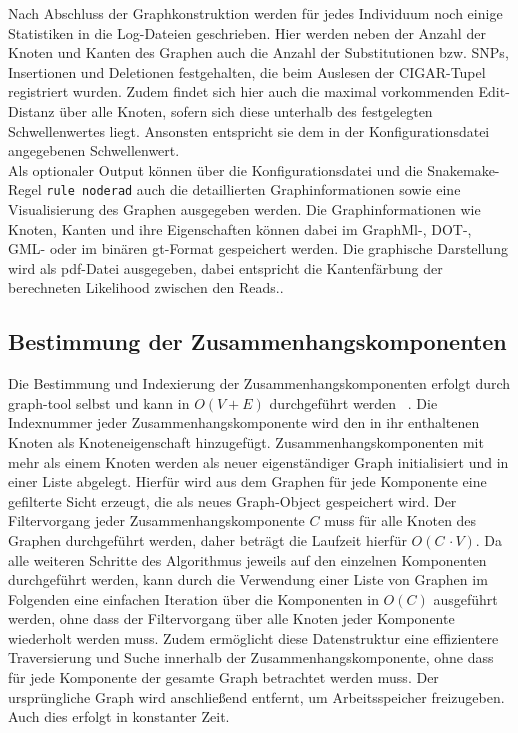 Nach Abschluss der Graphkonstruktion werden für jedes Individuum noch einige Statistiken in die Log-Dateien geschrieben. Hier werden neben der Anzahl der Knoten und Kanten des Graphen auch die Anzahl der Substitutionen bzw. SNPs, Insertionen und Deletionen festgehalten, die beim Auslesen der CIGAR-Tupel registriert wurden. Zudem findet sich hier auch die maximal vorkommenden Edit-Distanz über alle Knoten, sofern sich diese unterhalb des festgelegten Schwellenwertes liegt. Ansonsten entspricht sie dem in der Konfigurationsdatei angegebenen Schwellenwert.\\

Als optionaler Output können über die Konfigurationsdatei und die Snakemake-Regel \lstinline|rule noderad| auch die detaillierten Graphinformationen sowie eine Visualisierung des Graphen ausgegeben werden. Die Graphinformationen wie Knoten, Kanten und ihre Eigenschaften können dabei im GraphMl-, DOT-, GML- oder im binären gt-Format gespeichert werden. Die graphische Darstellung wird als pdf-Datei ausgegeben, dabei entspricht die Kantenfärbung der berechneten Likelihood zwischen den Reads.. \\

\subsection{Bestimmung der Zusammenhangskomponenten} \label{subsec:comp}

Die Bestimmung und Indexierung der Zusammenhangskomponenten erfolgt durch graph-tool selbst und kann in $ O(V + E) $ durchgeführt werden ~\cite{docs_graph_tool}. Die Indexnummer jeder Zusammenhangskomponente wird den in ihr enthaltenen Knoten als Knoteneigenschaft hinzugefügt. Zusammenhangskomponenten mit mehr als einem Knoten  werden als neuer eigenständiger Graph initialisiert und in einer Liste abgelegt. Hierfür wird aus dem Graphen für jede Komponente eine gefilterte Sicht erzeugt, die als neues Graph-Object gespeichert wird. Der Filtervorgang jeder Zusammenhangskomponente $ C $ muss für alle Knoten des Graphen durchgeführt werden, daher beträgt die Laufzeit hierfür $ O(C \, \cdotp V) $. Da alle weiteren Schritte des Algorithmus jeweils auf den einzelnen Komponenten durchgeführt werden, kann durch die Verwendung einer Liste von Graphen im Folgenden eine einfachen Iteration über die Komponenten in $ O(C) $ ausgeführt werden, ohne dass der Filtervorgang über alle Knoten jeder Komponente wiederholt werden muss. Zudem ermöglicht diese Datenstruktur eine effizientere Traversierung und Suche innerhalb der Zusammenhangskomponente, ohne dass für jede Komponente der gesamte Graph betrachtet werden muss. Der ursprüngliche Graph wird anschließend entfernt, um Arbeitsspeicher freizugeben. Auch dies erfolgt in konstanter Zeit. \\

